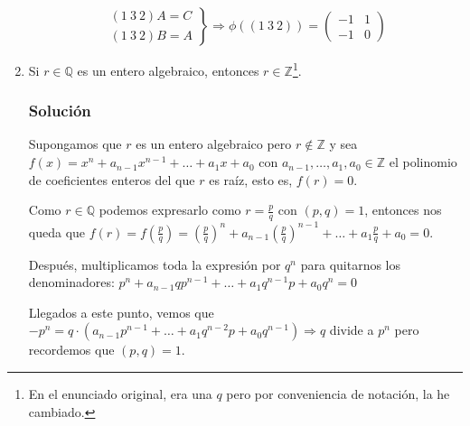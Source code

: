 \documentclass[paper=a4, fontsize=11pt, spanish]{scrartcl}
\begin{document}
\begin{enumerate}
		$$\left.\begin{aligned}
			(1\ 3\ 2)A = C\\
			(1\ 3\ 2)B = A
		\end{aligned}\right\} \Rightarrow \phi((1\ 3\ 2)) = \begin{pmatrix} -1 & 1\\ -1 & 0 \end{pmatrix}$$
		
       
		\item Si $r \in \mathbb{Q}$ es un entero algebraico, entonces $r \in \mathbb{Z}$\footnote{En el enunciado
		original, era una $q$ pero por conveniencia de notación, la he cambiado.}.
		\subsubsection*{Solución}
		Supongamos que $r$ es un entero algebraico pero $r \notin \mathbb{Z}$ y sea $f(x) = x^n + a_{n-1}x^{n-1}
		+ \dots + a_1x + a_0$ con $a_{n-1}, \dots, a_1, a_0 \in \mathbb{Z}$ el polinomio de coeficientes enteros
		del que $r$ es raíz, esto es, $f(r) = 0$.
		
		Como $r \in \mathbb{Q}$ podemos expresarlo como $\displaystyle r = \frac{p}{q}$ con $(p, q) = 1$, entonces
		nos queda que $\displaystyle f(r) = f\left(\frac{p}{q}\right) = \left(\frac{p}{q}\right)^n + a_{n-1}
		\left(\frac{p}{q}\right)^{n-1} + \dots + a_1\frac{p}{q} + a_0 = 0$.
		
		Después, multiplicamos toda la expresión por $q^n$ para quitarnos los denominadores: $p^n + a_{n-1}qp^{n-1}
		+ \dots + a_1q^{n-1}p + a_0q^n = 0$
		
		Llegados a este punto, vemos que $-p^n = q \cdot \left(a_{n-1}p^{n-1} + \dots + a_1q^{n-2}p + a_0q^{n-1}\right)
		\Rightarrow q$ divide a $p^n$ pero recordemos que $(p, q) = 1$.
	\end{enumerate}
\end{document}
